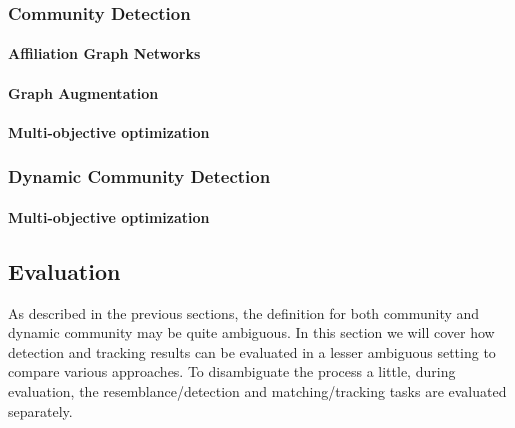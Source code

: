 \documentclass[
acmsmall,
nonacm,
screen,
acmthm]{../../scripts/pandoc/templates/acmart}
\begin{document}
\hypertarget{community-detection-2}{%
\subsubsection{Community Detection}\label{community-detection-2}}

\hypertarget{affiliation-graph-networks}{%
\paragraph{Affiliation Graph
Networks}\label{affiliation-graph-networks}}

\hypertarget{graph-augmentation}{%
\paragraph{Graph Augmentation}\label{graph-augmentation}}

\hypertarget{multi-objective-optimization}{%
\paragraph{Multi-objective
optimization}\label{multi-objective-optimization}}

\hypertarget{dynamic-community-detection-1}{%
\subsubsection{Dynamic Community
Detection}\label{dynamic-community-detection-1}}

\hypertarget{multi-objective-optimization-1}{%
\paragraph{Multi-objective
optimization}\label{multi-objective-optimization-1}}

\hypertarget{evaluation}{%
\subsection{Evaluation}\label{evaluation}}

As described in the previous sections, the definition for both community
and dynamic community may be quite ambiguous. In this section we will
cover how detection and tracking results can be evaluated in a lesser
ambiguous setting to compare various approaches. To disambiguate the
process a little, during evaluation, the resemblance/detection and
matching/tracking tasks are evaluated separately.
\end{document}
